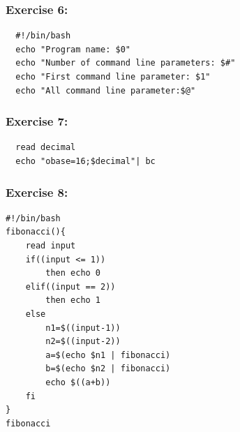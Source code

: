 \documentclass{article}
\begin{document}
\subsubsection{Exercise 6:}
\begin{verbatim}
  #!/bin/bash
  echo "Program name: $0"
  echo "Number of command line parameters: $#"
  echo "First command line parameter: $1"
  echo "All command line parameter:$@"
\end{verbatim}
\subsubsection{Exercise 7:}
\begin{verbatim}
  read decimal
  echo "obase=16;$decimal"| bc
\end{verbatim}
\subsubsection{Exercise 8:}
\begin{verbatim}
#!/bin/bash
fibonacci(){
    read input
    if((input <= 1))
        then echo 0
    elif((input == 2))
        then echo 1
    else
        n1=$((input-1))
        n2=$((input-2))
        a=$(echo $n1 | fibonacci)
        b=$(echo $n2 | fibonacci)
        echo $((a+b))
    fi
}
fibonacci
\end{verbatim}
\end{document}
